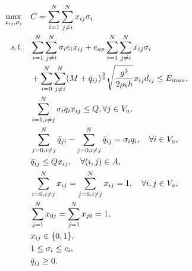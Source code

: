 \documentclass[AutoFakeBold]{LZUThesis}
\begin{document}
\begin{subequations}\label{GRP}
	\begin{align}
		\max_{x_{ij},\sigma_i} \quad & C = \sum^N_{i = 1}\sum^N_{j \neq i} x_{ij}\sigma_i                                                                                                          \\
		\emph{s.t.} \quad            & \sum^N_{i = 1}\sum^N_{j \neq i}\sigma_i e_i x_{ij} + e_{ap}\sum^N_{i=1}\sum^N_{j \neq i} x_{ij}\sigma_i \nonumber                                           \\
									 & + \sum^N_{i=0}\sum^N_{j \neq i} (M + \bar{q}_{ij})^{\frac{3}{2}}\sqrt{\frac{g^3}{2 \rho \varsigma h}} x_{ij} d_{ij} \leq E_{max}, \label{energy-constraint} \\
									 & \sum^N_{i=1, i\neq j} \sigma_i q_i x_{ij} \leq Q, \forall j \in V_a,\label{total-load}                                                                      \\
									 & \sum^N_{j=0, i\neq j}\bar{q}_{ji} -  \sum^N_{j=0, i\neq j}\bar{q}_{ij} = \sigma_i q_i, \label{carry-load} \quad \forall i \in V_a,                          \\
									 & \bar{q}_{ij} \leq Q x_{ij}, \quad \forall (i,j) \in A, \label{load}                                                                                         \\
									 & \sum^N_{i=0, i\neq j} x_{ij} = \sum^N_{j=0,i\neq j} x_{ij} = 1, \quad \forall i,j \in V_a, \label{enter-point}                                              \\
									 & \sum^N_{j=1} x_{0j} = \sum^N_{j=1} x_{j0} = 1, \label{start-point}                                                                                          \\
									 & x_{ij} \in \{0,1\}, \label{binary-variable}                                                                                                                 \\
									 & 1 \leq \sigma_i \leq c_i, \label{area-constraint}                                                                                                           \\
									 & \bar{q}_{ij} \geq 0. \label{flight-weight}
	\end{align}
\end{subequations}
\end{document}
